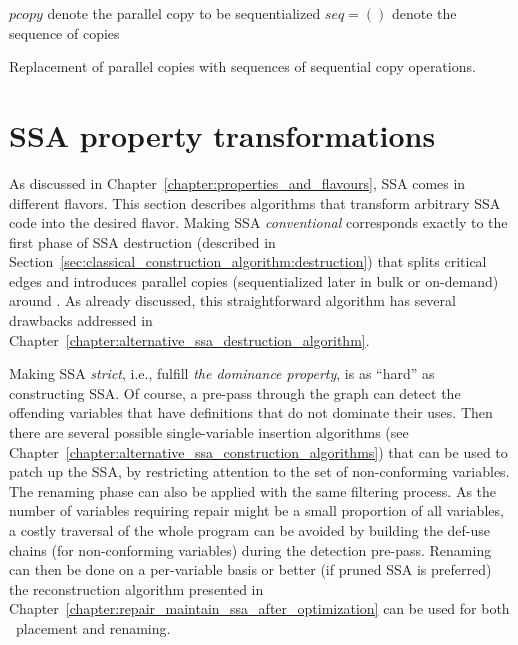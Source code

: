 {\begin{algorithm}[h]
    \Let $\textit{pcopy}$ denote the parallel copy to be sequentialized\;
    \Let $\textit{seq}=()$ denote the sequence of copies\;
\caption{\label{alg:ssadestruction:sequentialization}Replacement of
  parallel copies with sequences of sequential copy operations.}
\end{algorithm}



\section{SSA property transformations}
\label{section:classical_construction_algorithm:turning}
As discussed in Chapter~\ref{chapter:properties_and_flavours}, SSA comes in different flavors. 
This section describes algorithms that transform arbitrary SSA code into the desired flavor. 
Making SSA \emph{conventional} corresponds exactly to the first phase of SSA destruction (described in Section~\ref{sec:classical_construction_algorithm:destruction}) that splits critical edges and introduces parallel copies (sequentialized later in bulk or on-demand) around \phifuns. 
As already discussed, this straightforward algorithm has several drawbacks addressed in Chapter~\ref{chapter:alternative_ssa_destruction_algorithm}.

Making SSA \emph{strict}, i.e., fulfill \emph{the dominance property}, is as ``hard'' as constructing SSA. 
Of course, a pre-pass through the graph can detect the offending variables that have definitions that do not dominate their uses. 
Then there are several possible single-variable \phifun insertion algorithms (see Chapter~\ref{chapter:alternative_ssa_construction_algorithms}) that can be used to patch up the SSA, by restricting attention to the set of non-conforming variables. 
The renaming phase can also be applied with the same filtering process. 
As the number of variables requiring repair might be a small proportion of all variables, a costly traversal of the whole program can be avoided by building the def-use chains (for non-conforming variables) during the detection pre-pass. 
Renaming can then be done on a per-variable basis or better (if pruned SSA is preferred) the reconstruction algorithm presented in Chapter~\ref{chapter:repair_maintain_ssa_after_optimization} can be used for both \phifuns\ placement and renaming.


}

